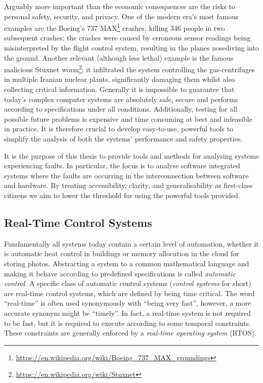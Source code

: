 Arguably more important than the economic consequences are the risks to personal safety, security, and privacy.
One of the modern era's most famous examples are the Boeing's 737 MAX\footnote{\url{https://en.wikipedia.org/wiki/Boeing_737_MAX_groundings}} crashes, killing 346 people in two subsequent crashes; the crashes were caused by erroneous sensor readings being misinterpreted by the flight control system, resulting in the planes nosediving into the ground.
Another relevant (although less lethal) example is the famous malicious Stuxnet worm\footnote{\url{https://en.wikipedia.org/wiki/Stuxnet}}; it infiltrated the system controlling the gas-centrifuges in multiple Iranian nuclear plants, significantly damaging them whilst also collecting critical information. 
Generally it is impossible to guarantee that today's complex computer systems are absolutely safe, secure and performs according to specifications under all conditions.
Additionally, testing for all possible future problems is expensive and time consuming at best and infeasible in practice.
It is therefore crucial to develop easy-to-use, powerful tools to simplify the analysis of both the systems' performance and safety properties.

It is the purpose of this thesis to provide tools and methods for analysing systems experiencing faults.
In particular, the focus is to analyse software integrated systems where the faults are occurring in the interconnection between software and hardware.
By treating accessibility, clarity, and generalisability as first-class citizens we aim to lower the threshold for using the powerful tools provided.




\subsection*{Real-Time Control Systems }%
%
%
Fundamentally all systems today contain a certain level of automation, whether it is automatic heat control in buildings or memory allocation in the cloud for storing photos.
Abstracting a system to a common mathematical language and making it behave according to predefined specifications is called \emph{automatic control}.
A specific class of automatic control systems (\emph{control systems} for short) are real-time control systems, which are defined by being time critical.
The word ``real-time'' is often used synonymously with ``being very fast'', however, a more accurate synonym might be ``timely''.
In fact, a real-time system is not required to be fast, but it is required to execute according to some temporal constraints.
These constraints are generally enforced by a \emph{real-time operating system} (RTOS).

